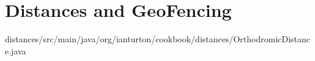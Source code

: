\chapter{Distances  and GeoFencing}




{distances/src/main/java/org/ianturton/cookbook/distances/OrthodromicDistance.java}
\label{distance1}
